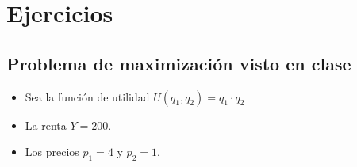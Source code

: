 \documentclass{templateNote}
\begin{document}

\newpage
\section{Ejercicios}
\subsection{Problema de maximización visto en clase}
\begin{itemize}
    \item Sea la función de utilidad $U(q_1,q_2) = q_1 \cdot q_2$
    \item La renta $Y = 200$.
    \item Los precios $p_1 = 4$ y $p_2 = 1$.
\end{itemize}
\end{document}
